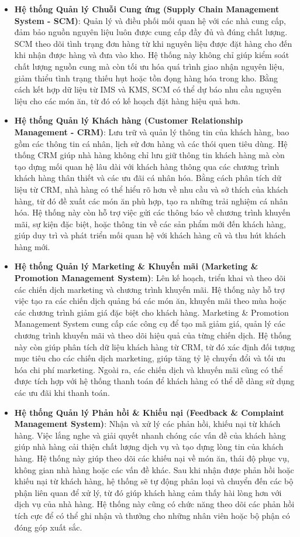 \begin{itemize}
	\item \textbf{Hệ thống Quản lý Chuỗi Cung ứng (Supply Chain Management System - SCM)}: Quản lý và điều phối mối quan hệ với các nhà cung cấp, đảm bảo nguồn nguyên liệu luôn được cung cấp đầy đủ và đúng chất lượng. SCM theo dõi tình trạng đơn hàng từ khi nguyên liệu được đặt hàng cho đến khi nhận được hàng và đưa vào kho. Hệ thống này không chỉ giúp kiểm soát chất lượng nguồn cung mà còn tối ưu hóa quá trình giao nhận nguyên liệu, giảm thiểu tình trạng thiếu hụt hoặc tồn đọng hàng hóa trong kho. Bằng cách kết hợp dữ liệu từ IMS và KMS, SCM có thể dự báo nhu cầu nguyên liệu cho các món ăn, từ đó có kế hoạch đặt hàng hiệu quả hơn.

	\item \textbf{Hệ thống Quản lý Khách hàng (Customer Relationship Management - CRM)}: Lưu trữ và quản lý thông tin của khách hàng, bao gồm các thông tin cá nhân, lịch sử đơn hàng và các thói quen tiêu dùng. Hệ thống CRM giúp nhà hàng không chỉ lưu giữ thông tin khách hàng mà còn tạo dựng mối quan hệ lâu dài với khách hàng thông qua các chương trình khách hàng thân thiết và các ưu đãi cá nhân hóa. Bằng cách phân tích dữ liệu từ CRM, nhà hàng có thể hiểu rõ hơn về nhu cầu và sở thích của khách hàng, từ đó đề xuất các món ăn phù hợp, tạo ra những trải nghiệm cá nhân hóa. Hệ thống này còn hỗ trợ việc gửi các thông báo về chương trình khuyến mãi, sự kiện đặc biệt, hoặc thông tin về các sản phẩm mới đến khách hàng, giúp duy trì và phát triển mối quan hệ với khách hàng cũ và thu hút khách hàng mới.

	\item \textbf{Hệ thống Quản lý Marketing \& Khuyến mãi (Marketing \& Promotion Management System)}: Lên kế hoạch, triển khai và theo dõi các chiến dịch marketing và chương trình khuyến mãi. Hệ thống này hỗ trợ việc tạo ra các chiến dịch quảng bá các món ăn, khuyến mãi theo mùa hoặc các chương trình giảm giá đặc biệt cho khách hàng. Marketing \& Promotion Management System cung cấp các công cụ để tạo mã giảm giá, quản lý các chương trình khuyến mãi và theo dõi hiệu quả của từng chiến dịch. Hệ thống này còn giúp phân tích dữ liệu khách hàng từ CRM, từ đó xác định đối tượng mục tiêu cho các chiến dịch marketing, giúp tăng tỷ lệ chuyển đổi và tối ưu hóa chi phí marketing. Ngoài ra, các chiến dịch và khuyến mãi cũng có thể được tích hợp với hệ thống thanh toán để khách hàng có thể dễ dàng sử dụng các ưu đãi khi thanh toán.

	\item \textbf{Hệ thống Quản lý Phản hồi \& Khiếu nại (Feedback \& Complaint Management System)}: Nhận và xử lý các phản hồi, khiếu nại từ khách hàng. Việc lắng nghe và giải quyết nhanh chóng các vấn đề của khách hàng giúp nhà hàng cải thiện chất lượng dịch vụ và tạo dựng lòng tin của khách hàng. Hệ thống này giúp theo dõi các khiếu nại về món ăn, thái độ phục vụ, không gian nhà hàng hoặc các vấn đề khác. Sau khi nhận được phản hồi hoặc khiếu nại từ khách hàng, hệ thống sẽ tự động phân loại và chuyển đến các bộ phận liên quan để xử lý, từ đó giúp khách hàng cảm thấy hài lòng hơn với dịch vụ của nhà hàng. Hệ thống này cũng có chức năng theo dõi các phản hồi tích cực để có thể ghi nhận và thưởng cho những nhân viên hoặc bộ phận có đóng góp xuất sắc.


\end{itemize}
